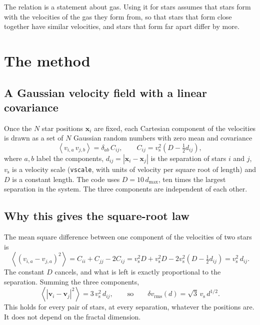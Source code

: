 \documentclass[11pt,a4paper]{article}
\newcommand{\bv}{\mathbf{v}}
\newcommand{\bx}{\mathbf{x}}
\newcommand{\vs}{v_{\mathrm s}}
\newcommand{\avg}[1]{\left\langle #1 \right\rangle}
\begin{document}
The relation is a statement about gas. Using it for stars assumes that
stars form with the velocities of the gas they form from, so that stars
that form close together have similar velocities, and stars that form
far apart differ by more.

\section{The method}

\subsection{A Gaussian velocity field with a linear covariance}

Once the $N$ star positions $\bx_i$ are fixed, each Cartesian component
of the velocities is drawn as a set of $N$ Gaussian random numbers with
zero mean and covariance
\begin{equation}
  \avg{v_{i,a}\,v_{j,b}} = \delta_{ab}\,C_{ij},
  \qquad
  C_{ij} = \vs^2\left(D - \tfrac12 d_{ij}\right),
  \label{eq:cov}
\end{equation}
where $a,b$ label the components, $d_{ij} = |\bx_i-\bx_j|$ is the
separation of stars $i$ and $j$, $\vs$ is a velocity scale
(\texttt{vscale}, with units of velocity per square root of length) and
$D$ is a constant length. The code uses $D = 10\,d_{\max}$, ten times
the largest separation in the system. The three components are
independent of each other.

\subsection{Why this gives the square-root law}

The mean square difference between one component of the velocities of
two stars is
\begin{equation}
  \avg{(v_{i,a}-v_{j,a})^2} = C_{ii} + C_{jj} - 2C_{ij}
  = \vs^2 D + \vs^2 D - 2\vs^2\left(D - \tfrac12 d_{ij}\right)
  = \vs^2\, d_{ij} .
\end{equation}
The constant $D$ cancels, and what is left is exactly proportional to
the separation. Summing the three components,
\begin{equation}
  \avg{|\bv_i-\bv_j|^2} = 3\,\vs^2\,d_{ij},
  \qquad\text{so}\qquad
  \delta v_{\mathrm{rms}}(d) = \sqrt{3}\,\vs\,d^{1/2}.
  \label{eq:sf}
\end{equation}
This holds for every pair of stars, at every separation, whatever the
positions are. It does not depend on the fractal dimension.
\end{document}
